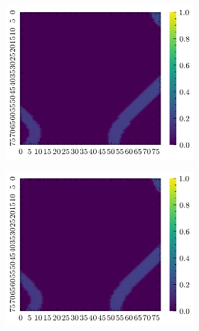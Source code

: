 \documentclass[../document.tex]{subfiles}
\begin{document}
\begin{figure}[h]
\begin{subfigure}[b]{1\textwidth}
\begin{subfigure}[b]{0.19\textwidth}
    \end{subfigure}
    \begin{subfigure}[b]{0.19\textwidth}
    \includegraphics[width=\linewidth]{../img/bars1-example-patches/2d/2.png}    
    \end{subfigure}  
    \begin{subfigure}[b]{0.19\textwidth}
    \includegraphics[width=\linewidth]{../img/bars1-example-patches/2d/4.png} 
    \end{subfigure}
    \begin{subfigure}[b]{0.19\textwidth}

\end{subfigure}
\end{subfigure}
\end{figure}
\end{document}

